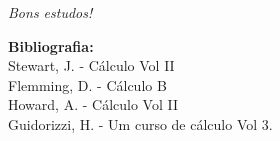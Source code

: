 \documentclass[a4paper,5pt]{amsbook}
\newcommand{\sen}{\text{sen}}
\numberwithin{equation}{chapter}
\begin{document}
\begin{enumerate}




\end{enumerate}



 


\begin{flushright}
 \textit{ Bons estudos!}
\end{flushright}
\begin{center}
 \textbf{Bibliografia:}\\ Stewart, J. - C\'alculo Vol II\\ Flemming, D. - C\'alculo B \\ Howard, A. - C\'alculo Vol II\\ Guidorizzi, H. - Um curso de c\'alculo Vol 3.
\end{center}
\end{document}

